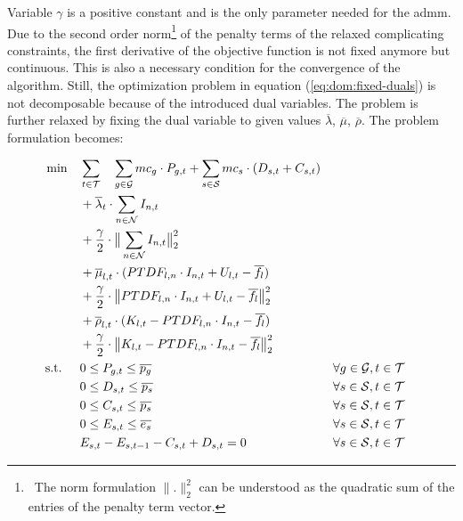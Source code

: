Variable $\gamma$ is a positive constant and is the only parameter needed for the \gls{admm}. Due to the second order norm\footnote{~The norm formulation $\big\| . \big\|^2_2$ can be understood as the quadratic sum of the entries of the penalty term vector.} of the penalty terms of the relaxed complicating constraints, the first derivative of the objective function is not fixed anymore but continuous. This is also a necessary condition for the convergence of the algorithm. Still, the optimization problem in equation (\ref{eq:dom:fixed-duals}) is not decomposable because of the introduced dual variables. The problem is further relaxed by fixing the dual variable to given values $\overline{\lambda}$, $\overline{\mu}$, $\overline{\rho}$. The problem formulation becomes:

\begin{subequations}
	\begin{align}
		 \min \quad & \sum_{t\in\mathcal{T}} \quad \sum_{g\in\mathcal{G}}mc_g \cdot P_{g,t} + \sum_{s\in\mathcal{S}}mc_s \cdot (D_{s,t}+C_{s,t}) \label{eq:dom:final} \\
		 & + \overline{\lambda}_t \cdot \sum_{n \in \mathcal{N}} I_{n,t} \nonumber \\
		 & + \frac{\gamma}{2} \cdot \big\|\sum_{n \in \mathcal{N}} I_{n,t}\big\|^2_2 \nonumber \\
		 & + \overline{\mu}_{l,t} \cdot (PTDF_{l,n} \cdot I_{n,t} + U_{l,t} - \overline{f_l}) \nonumber \\
		 & + \frac{\gamma}{2} \cdot \big\| PTDF_{l,n} \cdot I_{n,t} + U_{l,t} - \overline{f_l} \big\|^2_2 \nonumber \\
		 & + \overline{\rho}_{l,t} \cdot (K_{l,t} - PTDF_{l,n} \cdot I_{n,t} - \overline{f_l}) \nonumber \\
		 & + \frac{\gamma}{2} \cdot \big\|K_{l,t} - PTDF_{l,n} \cdot I_{n,t} - \overline{f_l} \big\|^2_2 \nonumber \\
		 \text{s.t. } \quad & 0 \leq P_{g,t} \leq \overline{p_g} && \forall g \in \mathcal{G}, t \in \mathcal{T}\\
		 & 0 \leq D_{s,t} \leq \overline{p_s} && \forall s \in \mathcal{S}, t \in \mathcal{T} \\
		 & 0 \leq C_{s,t} \leq \overline{p_s} && \forall s \in \mathcal{S}, t \in \mathcal{T} \\
		 & 0 \leq E_{s,t} \leq \overline{e_s} && \forall s \in \mathcal{S}, t \in \mathcal{T} \\
		 & E_{s,t} - E_{s,t-1} - C_{s,t} + D_{s,t} = 0 && \forall s \in \mathcal{S}, t \in \mathcal{T}
	\end{align}
\end{subequations}

